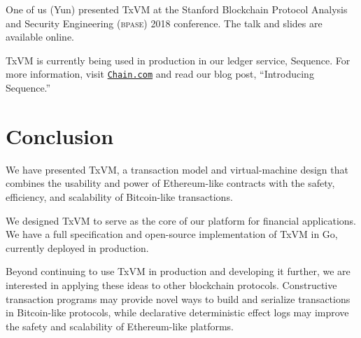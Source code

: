 \documentclass{article}
\newcommand{\txvm}{TxVM}
\begin{document}
One of us (Yun) presented \txvm{} at the Stanford Blockchain Protocol
Analysis and Security Engineering (\textsc{bpase}) 2018
conference. \cite{bpase} The talk and slides are available
online. \cite{txvm-talk} \cite{txvm-slides}

\txvm{} is currently being used in production in our ledger service,
Sequence. For more information, visit
\href{http://www.chain.com}{\texttt{Chain.com}} and read our blog
post, ``Introducing Sequence.'' \cite{sequence}

\section{Conclusion}

We have presented \txvm{}, a transaction model and virtual-machine design that combines the usability and power of Ethereum-like contracts with the safety, efficiency, and scalability of Bitcoin-like transactions.

We designed \txvm{} to serve as the core of our platform for financial applications. We have a full specification and open-source implementation of \txvm{} in Go, currently deployed in production.

Beyond continuing to use \txvm{} in production and developing it
further, we are interested in applying these ideas to other blockchain
protocols. Constructive transaction programs may provide novel ways to
build and serialize transactions in Bitcoin-like protocols, while
declarative deterministic effect logs may improve the safety and
scalability of Ethereum-like platforms.

\newpage

\printbibliography
\end{document}
